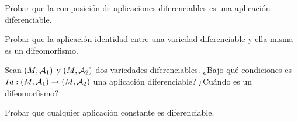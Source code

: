 \documentclass[twoside]{article}
\begin{document}
\newpage

\begin{ejercicio}{3}
Probar que la composición de aplicaciones diferenciables es una aplicación
diferenciable.
\end{ejercicio}
\begin{solucion}

\end{solucion}

\newpage

\begin{ejercicio}{4}
Probar que la aplicación identidad entre una variedad diferenciable y ella
misma es un difeomorfismo.
\end{ejercicio}
\begin{solucion}

\end{solucion}

\newpage

\begin{ejercicio}{5}
Sean $(M,\mathcal{A}_1)$ y $(M,\mathcal{A}_2)$ dos variedades diferenciables. ¿Bajo qué condiciones
es $Id : (M,\mathcal{A}_1) \to (M,\mathcal{A}_2)$ una aplicación diferenciable? ¿Cuándo es un
difeomorfismo?
\end{ejercicio}
\begin{solucion}

\end{solucion}

\newpage

\begin{ejercicio}{6}
Probar que cualquier aplicación constante es diferenciable.
\end{ejercicio}
\begin{solucion}

\end{solucion}
\end{document}

